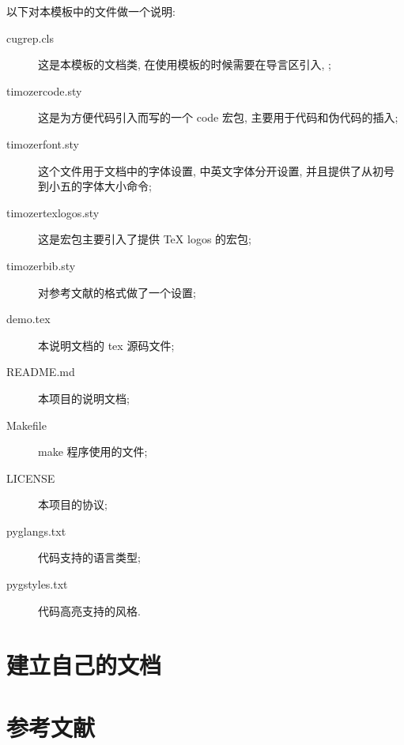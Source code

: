 \documentclass{cugrep}
\begin{document}
以下对本模板中的文件做一个说明:
\begin{description}
    \item[cugrep.cls] 这是本模板的文档类, 在使用模板的时候需要在导言区引入,  ;
    \item[timozercode.sty] 这是为方便代码引入而写的一个 code 宏包, 主要用于代码和伪代码的插入;
    \item[timozerfont.sty] 这个文件用于文档中的字体设置, 中英文字体分开设置, 并且提供了从初号到小五的字体大小命令;
    \item[timozertexlogos.sty] 这是宏包主要引入了提供 \TeX{} logos 的宏包;
    \item[timozerbib.sty] 对参考文献的格式做了一个设置;
    \item[demo.tex] 本说明文档的 tex 源码文件;
    \item[README.md] 本项目的说明文档;
    \item[Makefile] make 程序使用的文件;
    \item[LICENSE] 本项目的协议;
    \item[pyglangs.txt] 代码支持的语言类型;
    \item[pygstyles.txt] 代码高亮支持的风格. 
\end{description}

\section{建立自己的文档}

\section{参考文献}
\end{document}
